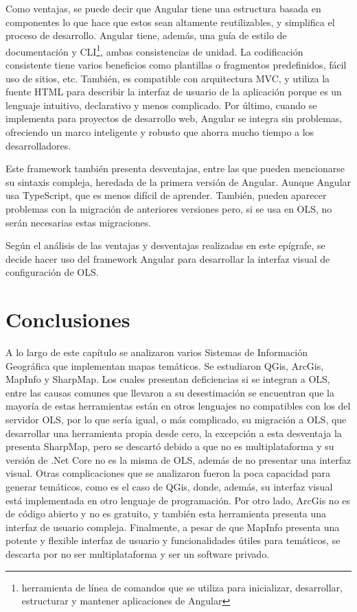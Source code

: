 Como ventajas, se puede decir que Angular tiene una estructura basada en componentes lo que hace que estos sean altamente reutilizables, y simplifica el proceso de desarrollo. Angular tiene, adem\'as, una gu\'ia de estilo de documentaci\'on y CLI\footnote{herramienta de l\'inea de comandos que se utiliza para inicializar, desarrollar, estructurar y mantener aplicaciones de Angular}, ambas consistencias de unidad. La codificaci\'on consistente tiene varios beneficios como plantillas o fragmentos predefinidos, f\'acil uso de sitios, etc. Tambi\'en, es compatible con arquitectura MVC, y utiliza la fuente HTML para describir la interfaz de usuario de la aplicaci\'on porque es un lenguaje intuitivo, declarativo y menos complicado. Por \'ultimo, cuando se implementa para proyectos de desarrollo web, Angular se integra sin problemas, ofreciendo un marco inteligente y robusto que ahorra mucho tiempo a los desarrolladores. 

Este framework tambi\'en presenta desventajas, entre las que pueden mencionarse su sintaxis compleja, heredada de la primera versi\'on de Angular. Aunque Angular usa TypeScript, que es menos dif\'icil de aprender. Tambi\'en, pueden aparecer problemas con la migraci\'on de anteriores versiones pero, si se usa en OLS, no ser\'an necesarias estas migraciones.

Seg\'un el an\'alisis de las ventajas y desventajas realizadas en este ep\'igrafe, se decide hacer uso del framework Angular para desarrollar la interfaz visual de configuraci\'on de OLS.


\section{Conclusiones}
A lo largo de este cap\'itulo se analizaron varios Sistemas de Informaci\'on Geogr\'afica que implementan mapas tem\'aticos. Se estudiaron QGis, ArcGis, MapInfo y SharpMap. Los cuales presentan deficiencias si se integran a OLS, entre las causas comunes que llevaron a su desestimaci\'on se encuentran que la mayor\'ia de estas herramientas est\'an en otros lenguajes no compatibles con los del servidor OLS, por lo que ser\'ia igual, o m\'as complicado, su migraci\'on a OLS, que desarrollar una herramienta propia desde cero, la excepci\'on a esta desventaja la presenta SharpMap, pero se descart\'o debido a que no es multiplataforma y su versi\'on de .Net Core no es la misma de OLS, adem\'as de no presentar una interfaz visual. Otras complicaciones que se analizaron fueron la poca capacidad para generar tem\'aticos, como es el caso de QGis, donde, adem\'as, su interfaz visual est\'a implementada en otro lenguaje de programaci\'on. Por otro lado, ArcGis no es de c\'odigo abierto y no es gratuito, y tambi\'en esta herramienta presenta una interfaz de usuario compleja. Finalmente, a pesar de que MapInfo presenta una potente y flexible interfaz de usuario y funcionalidades \'utiles para tem\'aticos, se descarta por no ser multiplataforma y ser un software privado.

